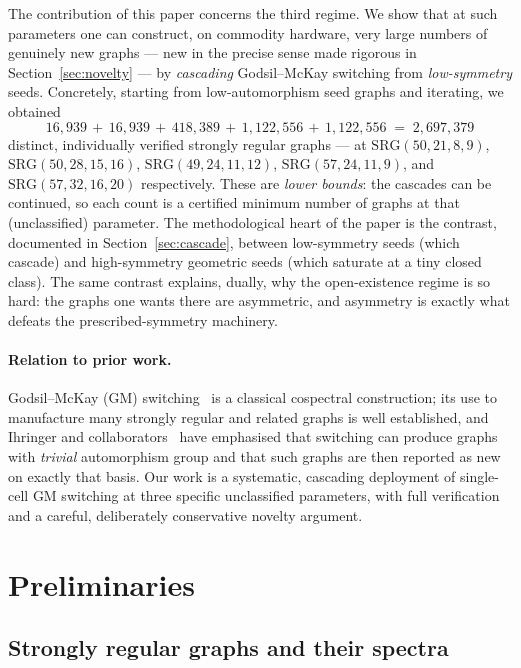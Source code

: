 \documentclass[11pt]{article}
\theoremstyle{definition}
\newcommand{\SRG}[1]{\mathrm{SRG}(#1)}
\begin{document}
The contribution of this paper concerns the third regime. We show that at such
parameters one can construct, on commodity hardware, very large numbers of genuinely
new graphs --- new in the precise sense made rigorous in
Section~\ref{sec:novelty} --- by \emph{cascading} Godsil--McKay switching from
\emph{low-symmetry} seeds. Concretely, starting from low-automorphism seed graphs and
iterating, we obtained
\[
  16{,}939 \,+\, 16{,}939 \,+\, 418{,}389 \,+\, 1{,}122{,}556 \,+\, 1{,}122{,}556
  \;=\; 2{,}697{,}379
\]
distinct, individually verified strongly regular graphs --- at $\SRG{50,21,8,9}$,
$\SRG{50,28,15,16}$, $\SRG{49,24,11,12}$, $\SRG{57,24,11,9}$, and $\SRG{57,32,16,20}$
respectively. These are \emph{lower bounds}: the cascades can be continued, so each count is
a certified minimum number of graphs at that (unclassified) parameter. The methodological heart of the
paper is the contrast, documented in Section~\ref{sec:cascade}, between low-symmetry
seeds (which cascade) and high-symmetry geometric seeds (which saturate at a tiny closed
class). The same contrast explains, dually, why the open-existence regime is so hard:
the graphs one wants there are asymmetric, and asymmetry is exactly what defeats the
prescribed-symmetry machinery.

\paragraph{Relation to prior work.} Godsil--McKay (GM) switching~\cite{gm1982} is a
classical cospectral construction; its use to manufacture many strongly regular and
related graphs is well established, and Ihringer and
collaborators~\cite{ihringer2020,ihringer-switching} have emphasised that switching can
produce graphs with \emph{trivial} automorphism group and that such graphs are then
reported as new on exactly that basis. Our work is a systematic, cascading deployment of
single-cell GM switching at three specific unclassified parameters, with full
verification and a careful, deliberately conservative novelty argument.

\section{Preliminaries}\label{sec:prelim}

\subsection{Strongly regular graphs and their spectra}
\end{document}
